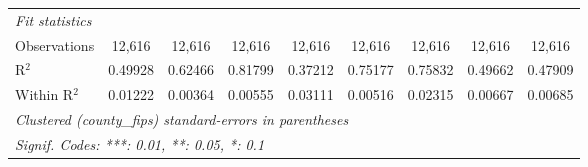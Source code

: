 \begin{tabular}{lcccccccc}
   \midrule
   \emph{Fit statistics}\\
   Observations         & 12,616                        & 12,616                      & 12,616                           & 12,616                        & 12,616                        & 12,616                         & 12,616                         & 12,616\\  
   R$^2$                & 0.49928                       & 0.62466                     & 0.81799                          & 0.37212                       & 0.75177                       & 0.75832                        & 0.49662                        & 0.47909\\  
   Within R$^2$         & 0.01222                       & 0.00364                     & 0.00555                          & 0.03111                       & 0.00516                       & 0.02315                        & 0.00667                        & 0.00685\\  
   \midrule \midrule
   \multicolumn{9}{l}{\emph{Clustered (county\_fips) standard-errors in parentheses}}\\
   \multicolumn{9}{l}{\emph{Signif. Codes: ***: 0.01, **: 0.05, *: 0.1}}\\
\end{tabular}
\par\endgroup



